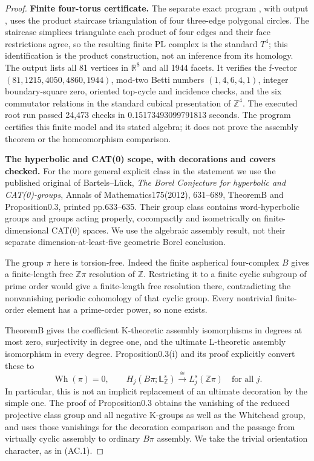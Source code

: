\begin{proof}
\textbf{Finite four-torus certificate.}
The separate exact program , with
output , uses the product
staircase triangulation of four three-edge polygonal circles.
The staircase simplices triangulate each product of four edges and
their face restrictions agree, so the resulting finite PL complex is
the standard $T^4$; this identification is the product construction,
not an inference from its homology. The output lists all 81 vertices
in $\mathbb R^8$ and all 1944 facets. It verifies the f-vector
$(81,1215,4050,4860,1944)$, mod-two Betti numbers $(1,4,6,4,1)$,
integer boundary-square zero, oriented top-cycle and incidence checks,
and the six commutator relations in the standard cubical presentation
of $\mathbb Z^4$. The executed root run passed 24,473 checks in
0.15173493099791813 seconds. The program certifies this finite model
and its stated algebra; it does not prove the assembly theorem or
the homeomorphism comparison.

\textbf{The hyperbolic and CAT(0) scope, with decorations and covers checked.}
For the more general explicit class in the statement we use the
published original of Bartels--L\"uck, \emph{The Borel Conjecture for
hyperbolic and CAT(0)-groups}, Annals of Mathematics175(2012),
631--689, TheoremB and Proposition0.3, printed pp.633--635.
Their group class contains word-hyperbolic groups and groups acting
properly, cocompactly and isometrically on finite-dimensional CAT(0)
spaces. We use the algebraic assembly result, not their separate
dimension-at-least-five geometric Borel conclusion.

The group $\pi$ here is torsion-free. Indeed the finite aspherical
four-complex $B$ gives a finite-length free $\mathbb Z\pi$ resolution
of $\mathbb Z$. Restricting it to a finite cyclic subgroup of prime
order would give a finite-length free resolution there, contradicting
the nonvanishing periodic cohomology of that cyclic group. Every
nontrivial finite-order element has a prime-order power, so none exists.

TheoremB gives the coefficient K-theoretic assembly isomorphisms in
degrees at most zero, surjectivity in degree one, and the ultimate
L-theoretic assembly isomorphism in every degree. Proposition0.3(i)
and its proof explicitly convert these to
\[
 \operatorname{Wh}(\pi)=0,
 \qquad H_j(B\pi;\mathbb L^s_{\mathbb Z})
                \xrightarrow{\cong} L_j^s(\mathbb Z\pi)
                \quad\text{for all }j.                            \tag{AC.16}
\]
In particular, this is not an implicit replacement of an ultimate
decoration by the simple one. The proof of Proposition0.3 obtains
the vanishing of the reduced projective class group and all negative
K-groups as well as the Whitehead group, and uses those vanishings
for the decoration comparison and the passage from virtually cyclic
assembly to ordinary $B\pi$ assembly. We take the trivial orientation
character, as in (AC.1).


\end{proof}
